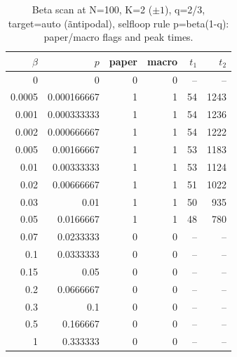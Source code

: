 \begin{table}[!htbp]
\centering
\small
\begin{tabular}{rrrrrr}
\toprule
$\beta$ & $p$ & paper & macro & $t_1$ & $t_2$\\
\midrule
0 & 0 & 0 & 0 & -- & --\\
0.0005 & 0.000166667 & 1 & 1 & 54 & 1243\\
0.001 & 0.000333333 & 1 & 1 & 54 & 1236\\
0.002 & 0.000666667 & 1 & 1 & 54 & 1222\\
0.005 & 0.00166667 & 1 & 1 & 53 & 1183\\
0.01 & 0.00333333 & 1 & 1 & 53 & 1124\\
0.02 & 0.00666667 & 1 & 1 & 51 & 1022\\
0.03 & 0.01 & 1 & 1 & 50 & 935\\
0.05 & 0.0166667 & 1 & 1 & 48 & 780\\
0.07 & 0.0233333 & 0 & 0 & -- & --\\
0.1 & 0.0333333 & 0 & 0 & -- & --\\
0.15 & 0.05 & 0 & 0 & -- & --\\
0.2 & 0.0666667 & 0 & 0 & -- & --\\
0.3 & 0.1 & 0 & 0 & -- & --\\
0.5 & 0.166667 & 0 & 0 & -- & --\\
1 & 0.333333 & 0 & 0 & -- & --\\
\bottomrule
\end{tabular}
\caption{Beta scan at N=100, K=2 ($\pm1$), q=2/3, target=auto (\~antipodal), selfloop rule p=beta(1-q): paper/macro flags and peak times.}
\label{tab:beta-scan-N100-K2-en}
\end{table}
